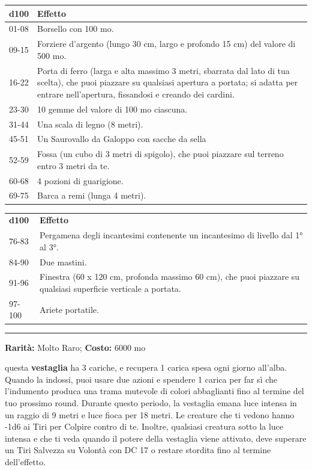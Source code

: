 \begin{multicols}{2}
\begin{tabularx}{0.48\textwidth}{lX}
\textbf{d100} & \textbf{Effetto}\\
\hline
01-08 &Borsello con 100 mo.\\
09-15& Forziere d'argento (lungo 30 cm, largo e profondo 15 cm) del valore di 500 mo.\\
16-22& Porta di ferro (larga e alta massimo 3 metri, sbarrata dal lato di tua scelta), che puoi piazzare su qualsiasi apertura a portata; si adatta per entrare nell'apertura, fissandosi e creando dei cardini.\\
23-30 &10 gemme del valore di 100 mo ciascuna.\\
31-44 &Una scala di legno (8 metri).\\
45-51 &Un Saurovallo da Galoppo con sacche da sella \\
52-59 & Fossa (un cubo di 3 metri di spigolo), che puoi piazzare sul terreno entro 3 metri da te.\\
60-68 &4 pozioni di guarigione. \\
69-75 &Barca a remi (lunga 4 metri).\\
\end{tabularx}
\begin{tabularx}{0.48\textwidth}{lX}
\textbf{d100} & \textbf{Effetto}\\
76-83& Pergamena degli incantesimi contenente un incantesimo di livello dal 1° al 3°.\\
84-90& Due mastini.\\
91-96 &Finestra (60 x 120 cm, profonda massimo 60 cm), che puoi piazzare su qualsiasi superficie verticale a portata.\\
97-100 &Ariete portatile.
\end{tabularx}


\medskip

\smallskip\noindent\rule{\linewidth}{2pt}  \hypertarget{TunicadeiColoriScintillanti}{}\smallskip{}\noindent\label{TunicadeiColoriScintillanti}

\textbf{Rarità:} Molto Raro; \textbf{Costo:} 6000 mo

questa \textbf{vestaglia} ha 3 cariche, e recupera 1 carica spesa ogni giorno all'alba. Quando la indossi, puoi usare due azioni e spendere 1 carica per far sì che l'indumento produca una trama mutevole di colori abbaglianti fino al termine del tuo prossimo round. Durante questo periodo, la vestaglia emana luce intensa in un raggio di 9 metri e luce fioca per 18 metri. Le creature che ti vedono hanno -1d6 ai Tiri per Colpire contro di te. Inoltre, qualsiasi creatura sotto la luce intensa e che ti veda quando il potere della vestaglia viene attivato, deve superare un Tiri Salvezza su Volontà con DC 17 o restare stordita fino al termine dell'effetto.


\end{multicols}
